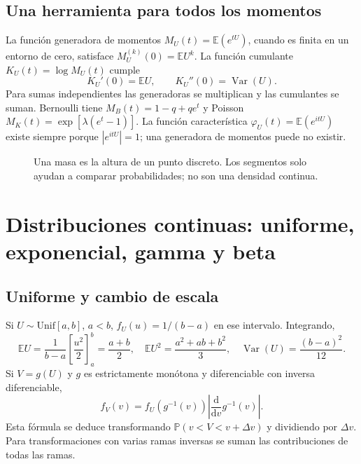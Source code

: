 \documentclass[11pt,a4paper]{article}
\newcommand{\E}{\mathbb E}
\newcommand{\Prob}{\mathbb P}
\DeclareMathOperator{\Var}{Var}
\theoremstyle{definition}
\begin{document}
\subsection{Una herramienta para todos los momentos}
La función generadora de momentos $M_U(t)=\E(e^{tU})$, cuando es finita en un entorno de cero, satisface $M_U^{(k)}(0)=\E U^k$. La función cumulante $K_U(t)=\log M_U(t)$ cumple
\[
K_U'(0)=\E U,\qquad K_U''(0)=\Var(U).
\]
Para sumas independientes las generadoras se multiplican y las cumulantes se suman. Bernoulli tiene $M_B(t)=1-q+qe^t$ y Poisson $M_K(t)=\exp[\lambda(e^t-1)]$. La función característica $\varphi_U(t)=\E(e^{itU})$ existe siempre porque $|e^{itU}|=1$; una generadora de momentos puede no existir.
\begin{figure}[H]\centering
{}\hfill
{}
\caption{Una masa es la altura de un punto discreto. Los segmentos solo ayudan a comparar probabilidades; no son una densidad continua.}
\end{figure}

\section{Distribuciones continuas: uniforme, exponencial, gamma y beta}
\subsection{Uniforme y cambio de escala}
Si $U\sim\mathrm{Unif}[a,b]$, $a<b$, $f_U(u)=1/(b-a)$ en ese intervalo. Integrando,
\[
\E U=\frac1{b-a}\left[\frac{u^2}2\right]_a^b=\frac{a+b}2,
\quad\E U^2=\frac{a^2+ab+b^2}3,
\quad\Var(U)=\frac{(b-a)^2}{12}.
\]
Si $V=g(U)$ y $g$ es estrictamente monótona y diferenciable con inversa diferenciable,
\[
f_V(v)=f_U(g^{-1}(v))\left|\frac{\mathrm d}{\mathrm dv}g^{-1}(v)\right|.
\]
Esta fórmula se deduce transformando $\Prob(v<V<v+\Delta v)$ y dividiendo por $\Delta v$. Para transformaciones con varias ramas inversas se suman las contribuciones de todas las ramas.
\end{document}
